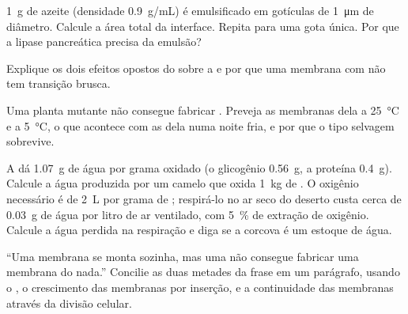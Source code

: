 \begin{exercise}[$\star\star$]\label{exo:b1:lipids:8}
\qty{1}{g} de azeite (densidade \qty{0.9}{g/mL}) é emulsificado em
gotículas de \qty{1}{\micro m} de diâmetro. Calcule a área total da
interface. Repita para uma gota única. Por que a lipase pancreática
precisa da emulsão?
\end{exercise}

\begin{exercise}[$\star\star$]\label{exo:b1:lipids:9}
Explique os dois efeitos opostos do  sobre a  e por que uma membrana com  não tem transição
brusca.
\end{exercise}

\begin{exercise}[$\star\star\star$]\label{exo:b1:lipids:10}
Uma planta mutante não consegue fabricar .
Preveja as membranas dela a \qty{25}{\celsius} e a \qty{5}{\celsius}, o
que acontece com as  dela numa noite fria, e por que o tipo
selvagem sobrevive.
\end{exercise}

\begin{exercise}[$\star\star\star$]\label{exo:b1:lipids:11}
A  dá \qty{1.07}{g} de água por grama oxidado (o glicogênio
\qty{0.56}{g}, a proteína \qty{0.4}{g}). Calcule a água produzida por um
camelo que oxida \qty{1}{kg} de . O oxigênio necessário é de
\qty{2}{L} por grama de ; respirá-lo no ar seco do deserto custa
cerca de \qty{0.03}{g} de água por litro de ar ventilado, com
\qty{5}{\%} de extração de oxigênio. Calcule a água perdida na
respiração e diga se a corcova é um estoque de água.
\end{exercise}

\begin{exercise}[$\star\star\star$]\label{exo:b1:lipids:12}
``Uma membrana se monta sozinha, mas uma  não consegue fabricar
uma membrana do nada.'' Concilie as duas metades da frase em um
parágrafo, usando o , o crescimento das membranas por
inserção, e a continuidade das membranas através da divisão celular.
\end{exercise}

